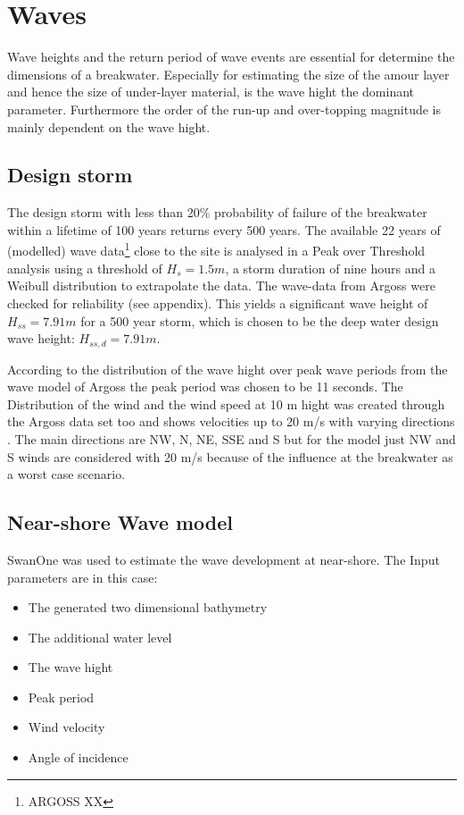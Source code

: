\section{Waves}
Wave heights and the return period of wave events are essential for determine the dimensions of a breakwater. Especially for estimating the size of the amour layer and hence the size of under-layer material, is the wave hight the dominant parameter. Furthermore the order of the run-up and over-topping magnitude is mainly dependent on the wave hight.
\subsection{Design storm}
The design storm with less than 20\% probability of failure of the breakwater within a lifetime of 100 years returns every 500 years.
The available 22 years of (modelled) wave data\footnote{ARGOSS XX} close to the site is analysed in a Peak over Threshold analysis using a threshold of $H_s=1.5m$, a storm duration of nine hours and a Weibull distribution to extrapolate the data. The wave-data from Argoss were checked for reliability (see appendix).
This yields a significant wave height of $H_{ss}=7.91m$ for a 500 year storm, which is chosen to be the deep water design wave height: $H_{ss,d}=7.91m$.

According to the distribution of the wave hight over peak wave periods from the wave model of Argoss %
the peak period was chosen to be 11 seconds.
The Distribution of the wind and the wind speed at 10 m hight was created through the Argoss data set too and shows velocities up to 20 m/s with varying directions
. The main  directions are NW, N, NE, SSE and S but for the model just NW and S winds are considered with 20 m/s because of the influence at the breakwater as a worst case scenario.

\subsection{Near-shore Wave model}
SwanOne was used to estimate the wave development at near-shore. The Input parameters are in this case:
\begin{itemize}
\item The generated two dimensional bathymetry
\item The additional water level
\item The wave hight
\item Peak period
\item Wind velocity
\item Angle of incidence 	
\end{itemize}

